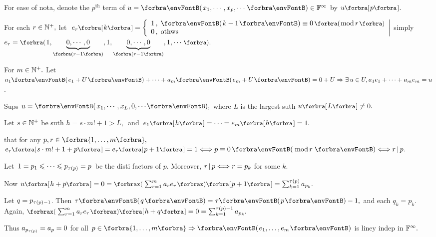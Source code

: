 For ease of nota, denote the $p^\text{th}$ term of $u=\Par{x_1,\cdots,x_p,\cdots}\in\Fbb^{\infty}$ by $u\Sbra{p}$.\vspace{2pt}\par\quad
For each $r\in{\mathbb{N}^+},$ let $\;e_r\Sbra{k}=\hMath[0pt]{l}{\left\{}{\right|}{1\,,\;\Par{k-1}\equiv 0\,\BigPar{\text{mod}\,r}\\0\,,\;\text{othws}}$ \;simply \,$e_r=\BigPar{1,\underbrace{0,\cdots,0}_{\SmallPar{r-1}},1,\underbrace{0,\cdots,0}_{\SmallPar{r-1}},1,\cdots}.$\vspace{6pt}\par\quad
For $m\in{\mathbb{N}^+}.$ Let $a_1\Par{e_1+U}+\dots+a_m\Par{e_m+U}=0+U\Rightarrow\exists\,u\in U,a_1 e_1+\dots+a_m e_m=u$.\vspace{2pt}\par\quad
Sups $u=\Par{x_1,\cdots,x_L,{0,\cdots}},$ where $L$ is the largest suth $u\Sbra{L}\neq 0.$\vspace{2pt}\par\quad
Let $s\in{\mathbb{N}^+}$ be suth $h=s\cdot m!+1> L,$ \,and \,$e_1\Sbra{h}=\cdots=e_m\Sbra{h}=1.$\vspace{2pt}\par\quad
\NOTICE that for any $p,r\in\Bra{1,\dots,m},$ \;$e_r\Sbra{s\cdot m!+1+p}=e_r\Sbra{p+1}=1\Longleftrightarrow p\equiv 0\,\Par{\,\text{mod}\,r\,}\Longleftrightarrow r\,\mmid\,p.$\par\vspace{2pt}\quad
Let \,$1=p_1\leqslant\cdots\leqslant p_{\tau(\hspace{0pt}p\hspace{0pt})}=p$\, be the disti factors of $p.$ Moreover, $r\,\text{\normalsize|}\,p\Longleftrightarrow r=p_k$ for some $k.$\par\vspace{2pt}\quad
Now $u\Sbra{h+p}=0=\XPar{\sum_{r=1}^m a_r e_r}\Sbra{p+1}=\sum_{k=1}^{\tau\TinyPar{p}}a_{p_k}.$\par\vspace{0pt}\quad
Let $q=p_{\tau(\hspace{0pt}p\hspace{0pt})-1}$. Then $\tau\Par{q}=\tau\Par{p}-1,$ and each $q_k=p_k.$ Again, $\XPar{\sum_{r=1}^m a_r e_r}\Sbra{h+q}=0=\sum_{k=1}^{\tau\TinyPar{p}-1}a_{p_k}.$\par\vspace{4pt}\quad
Thus $a_{p_{\tau(\hspace{0pt}p\hspace{0pt})}}=a_p=0$ for all $p\in\Bra{1,\dots,m}\Rightarrow\Par{e_1,\dots,e_m}$ is liney indep in ${\mathbb{F}}^{\infty}.$\vspace{2pt}\par\quad
